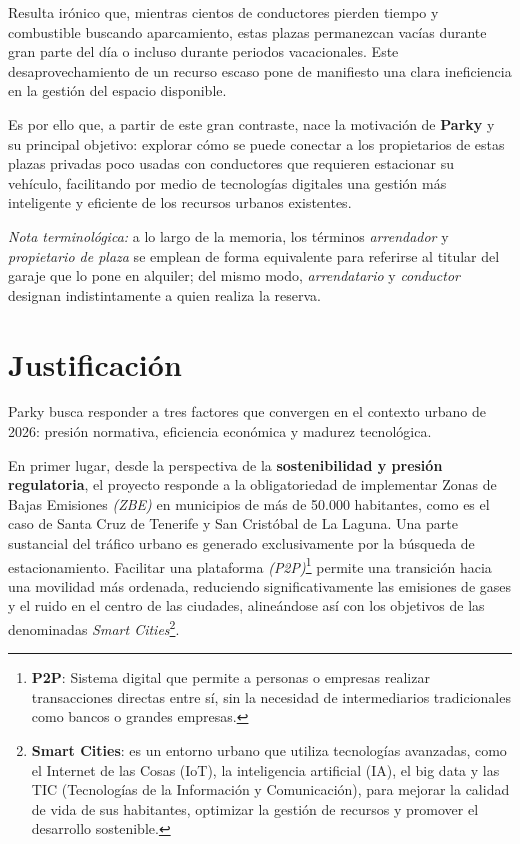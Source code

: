 Resulta irónico que, mientras cientos de conductores pierden tiempo y combustible buscando aparcamiento, estas plazas permanezcan vacías durante gran parte del día o incluso durante periodos vacacionales. Este desaprovechamiento de un recurso escaso pone de manifiesto una clara ineficiencia en la gestión del espacio disponible.

Es por ello que, a partir de este gran contraste, nace la motivación de \textbf{Parky} y su principal objetivo: explorar cómo se puede conectar a los propietarios de estas plazas privadas poco usadas con conductores que requieren estacionar su vehículo, facilitando por medio de tecnologías digitales una gestión más inteligente y eficiente de los recursos urbanos existentes.

\medskip
\noindent\textit{Nota terminológica:} a lo largo de la memoria, los términos \textit{arrendador} y \textit{propietario de plaza} se emplean de forma equivalente para referirse al titular del garaje que lo pone en alquiler; del mismo modo, \textit{arrendatario} y \textit{conductor} designan indistintamente a quien realiza la reserva.

\section{Justificación}
\label{sec:justificación}

Parky busca responder a tres factores que convergen en el contexto urbano de 2026: presión normativa, eficiencia económica y madurez tecnológica.

En primer lugar, desde la perspectiva de la \textbf{sostenibilidad y presión regulatoria}, el proyecto responde a la obligatoriedad de implementar Zonas de Bajas Emisiones \textit{(ZBE)} en municipios de más de 50.000 habitantes, como es el caso de Santa Cruz de Tenerife y San Cristóbal de La Laguna. Una parte sustancial del tráfico urbano es generado exclusivamente por la búsqueda de estacionamiento. Facilitar una plataforma \textit{(P2P)}\footnote{\textbf{P2P}: Sistema digital que permite a personas o empresas realizar transacciones directas entre sí, sin la necesidad de intermediarios tradicionales como bancos o grandes empresas.} permite una transición hacia una movilidad más ordenada, reduciendo significativamente las emisiones de gases y el ruido en el centro de las ciudades, alineándose así con los objetivos de las denominadas \textit{Smart Cities}\footnote{\textbf{Smart Cities}: es un entorno urbano que utiliza tecnologías avanzadas, como el Internet de las Cosas (IoT), la inteligencia artificial (IA), el big data y las TIC (Tecnologías de la Información y Comunicación), para mejorar la calidad de vida de sus habitantes, optimizar la gestión de recursos y promover el desarrollo sostenible.}.

